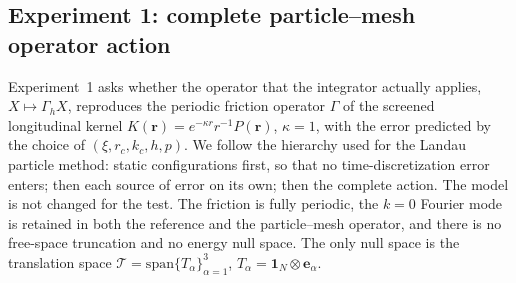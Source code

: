 \subsection{Experiment 1: complete particle--mesh operator action}
\label{sec:exp1}

Experiment~1 asks whether the operator that the integrator actually applies, $X\mapsto\Gamma_hX$, reproduces the
periodic friction operator $\Gamma$ of the screened longitudinal kernel $K(\mathbf r)=e^{-\kappa r}r^{-1}P(\mathbf r)$,
$\kappa=1$, with the error predicted by the choice of $(\xi,r_c,k_c,h,p)$. We follow the hierarchy used for the
Landau particle method: static configurations first, so that no time-discretization error enters; then each source
of error on its own; then the complete action. The model is not changed for the test. The friction is fully periodic,
the $k=0$ Fourier mode is retained in both the reference and the particle--mesh operator, and there is no free-space
truncation and no energy null space. The only null space is the translation space
$\mathcal T=\mathrm{span}\{T_\alpha\}_{\alpha=1}^3$, $T_\alpha=\mathbf 1_N\otimes\mathbf e_\alpha$.

